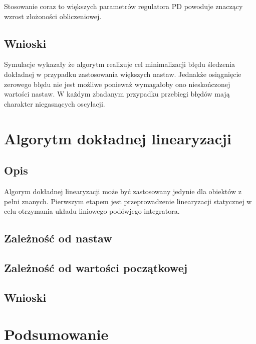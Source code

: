 \documentclass[12pt,a4paper]{article}
\begin{document}
    Stosowanie coraz to większych parametrów regulatora PD powoduje znaczący wzrost złożoności obliczeniowej.

  \subsection{Wnioski}
    Symulacje wykazały że algorytm realizuje cel minimalizacji błędu śledzenia dokładnej w przypadku zastosowania większych nastaw. Jednakże osiągnięcie zerowego błędu nie jest możliwe ponieważ wymagałoby ono nieskończonej wartości nastaw. W każdym zbadanym przypadku przebiegi błędów mają charakter niegasnących oscylacji.


\section{Algorytm dokładnej linearyzacji}
  \subsection{Opis} %
    Algorym dokładnej linearyzacji może być zastosowany jedynie dla obiektów z pełni znanych. Pierwszym etapem jest przeprowadzenie linearyzacji statycznej w celu otrzymania układu liniowego podówjego integratora.
  \subsection{Zależność od nastaw}

  \subsection{Zależność od wartości początkowej}
  \subsection{Wnioski}

\section{Podsumowanie}
\end{document}
